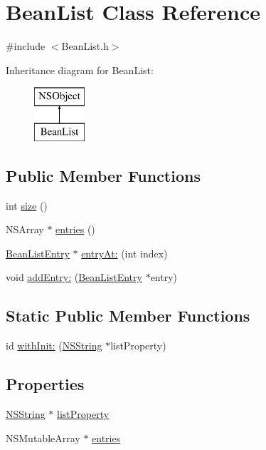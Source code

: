 \hypertarget{interface_bean_list}{
\section{\-Bean\-List \-Class \-Reference}
\label{interface_bean_list}
}


{\ttfamily \#include $<$\-Bean\-List.\-h$>$}

\-Inheritance diagram for \-Bean\-List\-:\begin{figure}[H]
\begin{center}
\leavevmode
\includegraphics[height=2.000000cm]{interface_bean_list}
\end{center}
\end{figure}
\subsection*{\-Public \-Member \-Functions}
\begin{DoxyCompactItemize}
\item 
int \hyperlink{interface_bean_list_a677c0c7e98b7166d23b2224e4ec854c5}{size} ()
\item 
\-N\-S\-Array $\ast$ \hyperlink{interface_bean_list_af1c53b82ba2cb9562ea7630e471ceaf0}{entries} ()
\item 
\hyperlink{interface_bean_list_entry}{\-Bean\-List\-Entry} $\ast$ \hyperlink{interface_bean_list_a16895457753978b69dd1a178db89a867}{entry\-At\-:} (int index)
\item 
void \hyperlink{interface_bean_list_af21170dda8374eaf8b5d030ab60718fb}{add\-Entry\-:} (\hyperlink{interface_bean_list_entry}{\-Bean\-List\-Entry} $\ast$entry)
\end{DoxyCompactItemize}
\subsection*{\-Static \-Public \-Member \-Functions}
\begin{DoxyCompactItemize}
\item 
id \hyperlink{interface_bean_list_ad3666667cd955df19593abe683db3001}{with\-Init\-:} (\hyperlink{class_n_s_string}{\-N\-S\-String} $\ast$list\-Property)
\end{DoxyCompactItemize}
\subsection*{\-Properties}
\begin{DoxyCompactItemize}
\item 
\hyperlink{class_n_s_string}{\-N\-S\-String} $\ast$ \hyperlink{interface_bean_list_a72cb4c81c0f5f1f1a492c55faac3f174}{list\-Property}
\item 
\-N\-S\-Mutable\-Array $\ast$ \hyperlink{interface_bean_list_adcdb8907081fd0834b43f367e477720f}{entries}
\end{DoxyCompactItemize}


